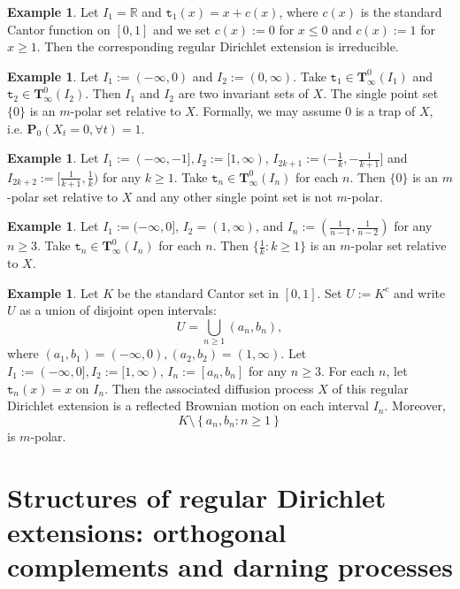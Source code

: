 \documentclass[a4paper]{amsart}
\theoremstyle{definition}
\newtheorem{example}[theorem]{Example}
\theoremstyle{remark}
\numberwithin{equation}{section}
\begin{document}
\begin{example}\label{EXA215}
Let $I_1=\mathbb{R}$ and ${{\mathtt{t}}}_1(x)=x+c(x)$, where $c(x)$ is the standard Cantor function on $[0,1]$ and we set $c(x):=0$ for $x\leq 0$ and $c(x):=1$ for $x\geq 1$.  Then the corresponding regular Dirichlet extension is irreducible.
\end{example}

\begin{example}
Let $I_1:=(-\infty, 0)$ and $I_2:=(0,\infty)$. Take ${{\mathtt{t}}}_1\in {{\mathbf{T}}}^0_\infty(I_1)$ and ${{\mathtt{t}}}_2\in {{\mathbf{T}}}^0_\infty(I_2)$. Then $I_1$ and $I_2$ are two invariant sets of $X$. The single point set $\{0\}$ is an $m$-polar set relative to $X$. Formally, we may assume $0$ is a trap of $X$, i.e. $\mathbf{P}_0(X_t=0,\forall t)=1$.
\end{example}

\begin{example}
Let $I_1:=(-\infty,-1], I_2:=[1,\infty)$, $I_{2k+1}:=(-\frac{1}{k},-\frac{1}{k+1}]$ and $I_{2k+2}:=[\frac{1}{k+1}, \frac{1}{k} )$ for any $k \geq 1$. Take ${{\mathtt{t}}}_n\in {{\mathbf{T}}}_\infty^0(I_n)$ for each $n$. Then $\{0\}$ is an $m$-polar set relative to $X$ and any other single point set is not $m$-polar.
\end{example}

\begin{example}
Let $I_1:=(-\infty, 0]$, $I_2=(1,\infty)$, and $I_n:=(\frac{1}{n-1}, \frac{1}{n-2})$ for any $n\geq 3$. Take ${{\mathtt{t}}}_n\in {{\mathbf{T}}}_\infty^0(I_n)$ for each $n$. Then $\{\frac{1}{k}:k\geq 1\}$ is an $m$-polar set relative to $X$.
\end{example}

\begin{example}\label{EXA218}
Let $K$ be the standard Cantor set in $[0,1]$. Set $U:=K^c$ and write $U$ as a union of disjoint open intervals:
\[
U=\bigcup_{n\geq 1}(a_n,b_n),
\]
where $(a_1,b_1)=(-\infty,0), (a_2,b_2)=(1,\infty)$. Let $I_1:=(-\infty, 0], I_2:=[1,\infty)$, $I_n:=[a_{n},b_{n}]$ for any $n\geq 3$. For each $n$, let ${{\mathtt{t}}}_n(x)=x$ on $I_n$. Then the associated diffusion process $X$ of this regular Dirichlet extension is a reflected Brownian motion on each interval $I_n$. Moreover,
\[
	K\setminus \left \{a_n,b_n: n\geq 1 \right\}
\]
is $m$-polar.
\end{example}

\section{{Structures of regular Dirichlet extensions: orthogonal complements and darning processes}}\label{SEC3}
\end{document}

